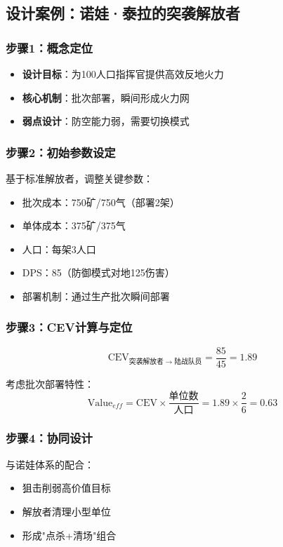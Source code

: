 \documentclass[a4paper,12pt]{article}
\begin{document}
\subsection{设计案例：诺娃·泰拉的突袭解放者}

\subsubsection{步骤1：概念定位}
\begin{itemize}
\item \textbf{设计目标}：为100人口指挥官提供高效反地火力
\item \textbf{核心机制}：批次部署，瞬间形成火力网
\item \textbf{弱点设计}：防空能力弱，需要切换模式
\end{itemize}

\subsubsection{步骤2：初始参数设定}
基于标准解放者，调整关键参数：
\begin{itemize}
\item 批次成本：750矿/750气（部署2架）
\item 单体成本：375矿/375气
\item 人口：每架3人口
\item DPS：85（防御模式对地125伤害）
\item 部署机制：通过生产批次瞬间部署
\end{itemize}

\subsubsection{步骤3：CEV计算与定位}
\begin{equation}
\text{CEV}_{突袭解放者 \rightarrow 陆战队员} = \frac{85}{45} = 1.89
\end{equation}

考虑批次部署特性：
\begin{equation}
\text{Value}_{eff} = \text{CEV} \times \frac{\text{单位数}}{\text{人口}} = 1.89 \times \frac{2}{6} = 0.63
\end{equation}

\subsubsection{步骤4：协同设计}
与诺娃体系的配合：
\begin{itemize}
\item 狙击削弱高价值目标
\item 解放者清理小型单位
\item 形成"点杀+清场"组合
\end{itemize}
\end{document}
